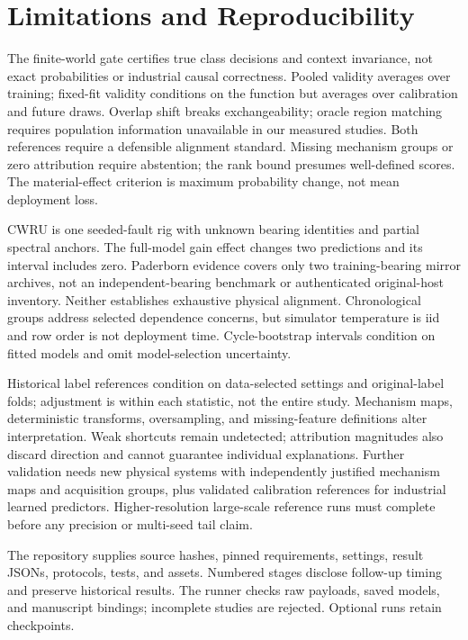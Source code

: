 \documentclass[conference]{IEEEtran}
\begin{document}
\section{Limitations and Reproducibility}
The finite-world gate certifies true class decisions and context invariance, not exact probabilities or industrial causal correctness. Pooled validity averages over training; fixed-fit validity conditions on the function but averages over calibration and future draws. Overlap shift breaks exchangeability; oracle region matching requires population information unavailable in our measured studies. Both references require a defensible alignment standard. Missing mechanism groups or zero attribution require abstention; the rank bound presumes well-defined scores. The material-effect criterion is maximum probability change, not mean deployment loss.

CWRU is one seeded-fault rig with unknown bearing identities and partial spectral anchors. The full-model gain effect changes two predictions and its interval includes zero. Paderborn evidence covers only two training-bearing mirror archives, not an independent-bearing benchmark or authenticated original-host inventory. Neither establishes exhaustive physical alignment. Chronological groups address selected dependence concerns, but simulator temperature is iid and row order is not deployment time. Cycle-bootstrap intervals condition on fitted models and omit model-selection uncertainty.

Historical label references condition on data-selected settings and original-label folds; adjustment is within each statistic, not the entire study. Mechanism maps, deterministic transforms, oversampling, and missing-feature definitions alter interpretation. Weak shortcuts remain undetected; attribution magnitudes also discard direction and cannot guarantee individual explanations. Further validation needs new physical systems with independently justified mechanism maps and acquisition groups, plus validated calibration references for industrial learned predictors. Higher-resolution large-scale reference runs must complete before any precision or multi-seed tail claim.

The repository supplies source hashes, pinned requirements, settings, result JSONs, protocols, tests, and assets. Numbered stages disclose follow-up timing and preserve historical results. The runner checks raw payloads, saved models, and manuscript bindings; incomplete studies are rejected. Optional runs retain checkpoints.
\end{document}
